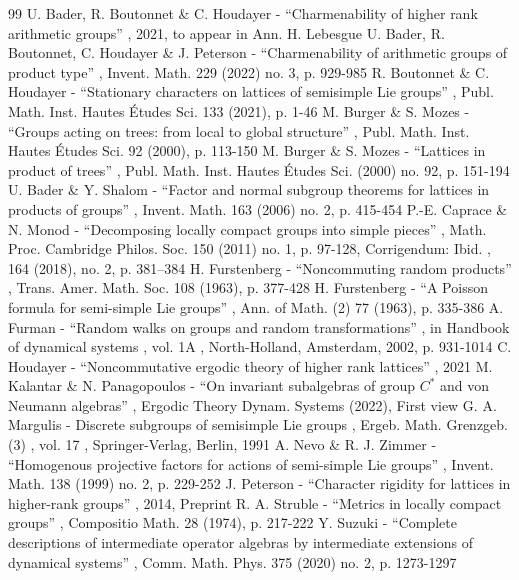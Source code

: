 \documentclass[11pt]{article}
\theoremstyle{definition}
\begin{document}
\begin{thebibliography}{99}
 U. Bader, R. Boutonnet \& C. Houdayer - “Charmenability of higher rank arithmetic groups” , 2021, to appear in Ann. H. Lebesgue
 U. Bader, R. Boutonnet, C. Houdayer \& J. Peterson - “Charmenability of arithmetic groups of product type” , Invent. Math. 229 (2022) no. 3, p. 929-985
 R. Boutonnet \& C. Houdayer - “Stationary characters on lattices of semisimple Lie groups” , Publ. Math. Inst. Hautes Études Sci. 133 (2021), p. 1-46
 M. Burger \& S. Mozes - “Groups acting on trees: from local to global structure” , Publ. Math. Inst. Hautes Études Sci. 92 (2000), p. 113-150
 M. Burger \& S. Mozes - “Lattices in product of trees” , Publ. Math. Inst. Hautes Études Sci. (2000) no. 92, p. 151-194
 U. Bader \& Y. Shalom - “Factor and normal subgroup theorems for lattices in products of groups” , Invent. Math. 163 (2006) no. 2, p. 415-454
 P.-E. Caprace \& N. Monod - “Decomposing locally compact groups into simple pieces” , Math. Proc. Cambridge Philos. Soc. 150 (2011) no. 1, p. 97-128, Corrigendum: Ibid. , 164 (2018), no. 2, p. 381–384
 H. Furstenberg - “Noncommuting random products” , Trans. Amer. Math. Soc. 108 (1963), p. 377-428
 H. Furstenberg - “A Poisson formula for semi-simple Lie groups” , Ann. of Math. (2) 77 (1963), p. 335-386
 A. Furman - “Random walks on groups and random transformations” , in Handbook of dynamical systems , vol. 1A , North-Holland, Amsterdam, 2002, p. 931-1014
 C. Houdayer - “Noncommutative ergodic theory of higher rank lattices” , 2021
 M. Kalantar \& N. Panagopoulos - “On invariant subalgebras of group $C^*$ and von Neumann algebras” , Ergodic Theory Dynam. Systems (2022), First view
 G. A. Margulis - Discrete subgroups of semisimple Lie groups , Ergeb. Math. Grenzgeb. (3) , vol. 17 , Springer-Verlag, Berlin, 1991
 A. Nevo \& R. J. Zimmer - “Homogenous projective factors for actions of semi-simple Lie groups” , Invent. Math. 138 (1999) no. 2, p. 229-252
 J. Peterson - “Character rigidity for lattices in higher-rank groups” , 2014, Preprint
 R. A. Struble - “Metrics in locally compact groups” , Compositio Math. 28 (1974), p. 217-222
 Y. Suzuki - “Complete descriptions of intermediate operator algebras by intermediate extensions of dynamical systems” , Comm. Math. Phys. 375 (2020) no. 2, p. 1273-1297
\end{thebibliography}
\end{document}

